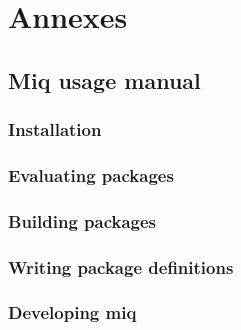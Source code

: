 \chapter{Annexes}

\section{Miq usage manual}

\subsection{Installation}

\subsection{Evaluating packages}

\subsection{Building packages}

\subsection{Writing package definitions}

\subsection{Developing miq}
